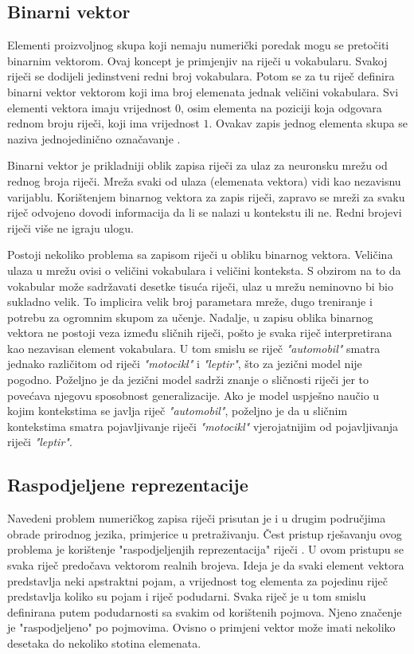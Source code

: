 \documentclass[times, utf8, diplomski, numeric]{fer}
\begin{document}
\subsection{Binarni vektor}

Elementi proizvoljnog skupa koji nemaju numerički poredak mogu se pretočiti binarnim vektorom. Ovaj koncept je primjenjiv na riječi u vokabularu. Svakoj riječi se dodijeli jedinstveni redni broj vokabulara. Potom se za tu riječ definira binarni vektor vektorom koji ima broj elemenata jednak veličini vokabulara. Svi elementi vektora imaju vrijednost $0$, osim elementa na poziciji koja odgovara rednom broju riječi, koji ima vrijednost $1$. Ovakav zapis jednog elementa skupa se naziva jednojedinično označavanje .

Binarni vektor je prikladniji oblik zapisa riječi za ulaz za neuronsku mrežu od rednog broja riječi. Mreža svaki od ulaza (elemenata vektora) vidi kao nezavisnu varijablu. Korištenjem binarnog vektora za zapis riječi, zapravo se mreži za svaku riječ odvojeno dovodi informacija da li se nalazi u kontekstu ili ne. Redni brojevi riječi više ne igraju ulogu. 

Postoji nekoliko problema sa zapisom riječi u obliku binarnog vektora. Veličina ulaza u mrežu ovisi o veličini vokabulara i veličini konteksta. S obzirom na to da vokabular može sadržavati desetke tisuća riječi, ulaz u mrežu neminovno bi bio sukladno velik. To implicira velik broj parametara mreže, dugo treniranje i potrebu za ogromnim skupom za učenje. Nadalje, u zapisu oblika binarnog vektora ne postoji veza između sličnih riječi, pošto je svaka riječ interpretirana kao nezavisan element vokabulara. U tom smislu se riječ \textit{"automobil"} smatra jednako različitom od riječi \textit{"motocikl"} i \textit{"leptir"}, što za jezični model nije pogodno. Poželjno je da jezični model sadrži znanje o sličnosti riječi jer to povećava njegovu sposobnost generalizacije. Ako je model uspješno naučio u kojim kontekstima se javlja riječ \textit{"automobil"}, poželjno je da u sličnim kontekstima smatra pojavljivanje riječi \textit{"motocikl"} vjerojatnijim od pojavljivanja riječi \textit{"leptir"}.

\subsection{Raspodjeljene reprezentacije}

Navedeni problem numeričkog zapisa riječi prisutan je i u drugim područjima obrade prirodnog jezika, primjerice u pretraživanju. Čest pristup rješavanju ovog problema je korištenje "raspodjeljenjih reprezentacija"  riječi \cite{Rumelhart1986}. U ovom pristupu se svaka riječ predočava vektorom realnih brojeva. Ideja je da svaki element vektora predstavlja neki apstraktni pojam, a vrijednost tog elementa za pojedinu riječ predstavlja koliko su pojam i riječ podudarni. Svaka riječ je u tom smislu definirana putem podudarnosti sa svakim od korištenih pojmova. Njeno značenje je "raspodjeljeno" po pojmovima. Ovisno o primjeni vektor može imati nekoliko desetaka do nekoliko stotina elemenata.
\end{document}
